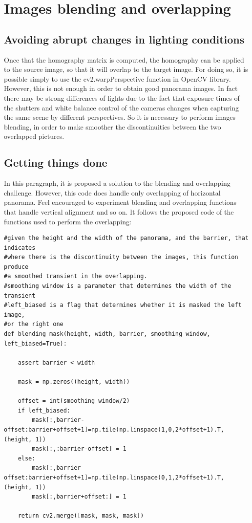 \documentclass[aps,letterpaper,10pt]{revtex4}
\begin{document}
\section{Images blending and overlapping}
\subsection{Avoiding abrupt changes in lighting conditions}
Once that the homography matrix is computed, the homography can be applied to the source image, so that it will overlap to the target image. For doing so, it is possible simply to use the cv2.warpPerspective function in OpenCV library. However, this is not enough in order to obtain good panorama images. In fact there may be strong differences of lights due to the fact that exposure times of the shutters and white balance control of the cameras changes when capturing the same scene by different perspectives. So it is necessary to perform images blending, in order to make smoother the discontinuities between the two overlapped pictures.
\subsection{Getting things done}
In this paragraph, it is proposed a solution to the blending and overlapping challenge. However, this code does handle only overlapping of horizontal panorama. Feel encouraged to experiment blending and overlapping functions that handle vertical alignment and so on.
It follows the proposed code of the functions used to perform the overlapping:

\begin{lstlisting}
#given the height and the width of the panorama, and the barrier, that indicates
#where there is the discontinuity between the images, this function produce
#a smoothed transient in the overlapping.
#smoothing window is a parameter that determines the width of the transient
#left_biased is a flag that determines whether it is masked the left image,
#or the right one
def blending_mask(height, width, barrier, smoothing_window, left_biased=True):

    assert barrier < width

    mask = np.zeros((height, width))
    
    offset = int(smoothing_window/2)
    if left_biased:
        mask[:,barrier-offset:barrier+offset+1]=np.tile(np.linspace(1,0,2*offset+1).T, (height, 1))
        mask[:,:barrier-offset] = 1
    else:
        mask[:,barrier-offset:barrier+offset+1]=np.tile(np.linspace(0,1,2*offset+1).T, (height, 1))
        mask[:,barrier+offset:] = 1
    
    return cv2.merge([mask, mask, mask])
\end{lstlisting}
\end{document}
